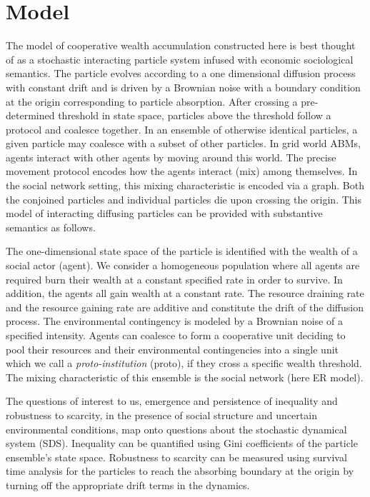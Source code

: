 \section{Model}
The model of cooperative wealth accumulation constructed here is best thought of as a stochastic interacting particle system infused with economic sociological semantics. The particle evolves according to a one dimensional diffusion process with constant drift and is driven by a Brownian noise with a boundary condition at the origin corresponding to particle absorption. After crossing a pre-determined threshold in state space, particles above the threshold follow a protocol and coalesce together. In an ensemble of otherwise identical particles, a given particle may coalesce with a subset of other particles. In grid world ABMs, agents interact with other agents by moving around this world. The precise movement protocol encodes how the agents interact (mix) among themselves. In the social network setting, this mixing characteristic is encoded via a graph. Both the conjoined particles and individual particles die upon crossing the origin. This model of interacting diffusing particles can be provided with substantive semantics as follows. 

The one-dimensional state space of the particle is identified with the wealth of a social actor (agent). We consider a homogeneous population where all agents are required burn their wealth at a constant specified rate in order to survive. In addition, the agents all gain wealth at a constant rate. The resource draining rate and the resource gaining rate are additive and constitute the drift of the diffusion process. The environmental contingency is modeled by a Brownian noise of a specified intensity. Agents can coalesce to form a cooperative unit deciding to pool their resources and their environmental contingencies into a single unit which we call a \textit{proto-institution} (proto), if they cross a specific wealth threshold. The mixing characteristic of this ensemble is the social network (here ER model).          

The questions of interest to us, emergence and persistence of inequality and robustness to scarcity, in the presence of social structure and uncertain environmental conditions, map onto questions about the stochastic dynamical system (SDS). Inequality can be quantified using Gini coefficients of the particle ensemble's state space. Robustness to scarcity can be measured using survival time analysis for the particles to reach the absorbing boundary at the origin by turning off the appropriate drift terms in the dynamics. 

